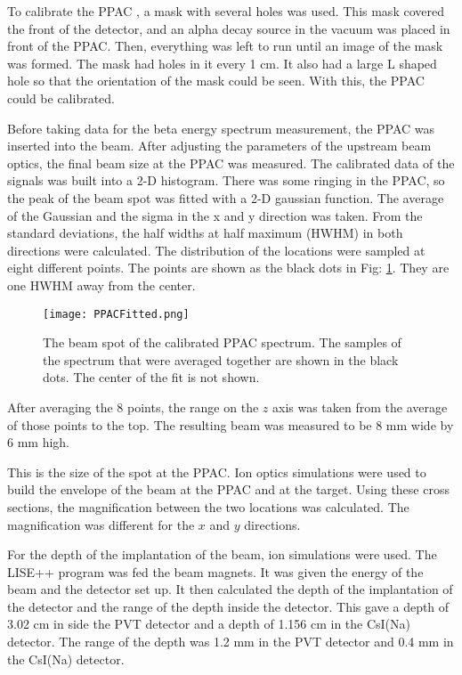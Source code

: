 \documentclass[../MaxHughesThesis.tex]{subfiles}
\begin{document}
To calibrate the PPAC , a mask with several holes was used. 
This mask covered the front of the detector, and an alpha decay source in the vacuum was placed in front of the PPAC.
Then, everything was left to run until an image of the mask was formed.
The mask had holes in it every 1 cm. 
It also had a large L shaped hole so that the orientation of the mask could be seen. 
With this, the PPAC could be calibrated.

Before taking data for the beta energy spectrum measurement, the PPAC was inserted into the beam.
After adjusting the parameters of the upstream beam optics, the final beam size at the PPAC was measured.
The calibrated data of the signals was built into a 2-D histogram.
There was some ringing in the PPAC, so the peak of the beam spot was fitted with a 2-D gaussian function.
The average of the Gaussian and the sigma in the x and y direction was taken. 
From the standard deviations, the half widths at half maximum (HWHM) in both directions were calculated. 
The distribution of the locations were sampled at eight different points. 
The points are shown as the black dots in Fig: \ref{fig:PPACSpotch}.
They are one HWHM away from the center. 

\begin{figure}
	\centerline{\texttt{[image: PPACFitted.png]}}
	\caption{The beam spot of the calibrated PPAC spectrum. 
		 The samples of the spectrum that were averaged together are shown in the black dots.
		 The center of the fit is not shown.}
	\label{fig:PPACSpotch}
\end{figure}  

After averaging the 8 points, the range on the $z$ axis was taken from the average of those points to the top.
The resulting beam was measured to be 8 mm wide by 6 mm high.

This is the size of the spot at the PPAC. 
Ion optics simulations were used to build the envelope of the beam at the PPAC and at the target.
Using these cross sections, the magnification between the two locations was calculated.
The magnification was different for the $x$ and $y$ directions.

For the depth of the implantation of the beam, ion simulations were used. 
The LISE++ program was fed the beam magnets. It was given the energy of the beam and the detector set up. 
It then calculated the depth of the implantation of the detector and the range of the depth inside the detector. 
This gave a depth of 3.02 cm in side the PVT detector and a depth of 1.156 cm in the CsI(Na) detector. 
The range of the depth was 1.2 mm in the PVT detector and 0.4 mm in the CsI(Na) detector.
\end{document}
